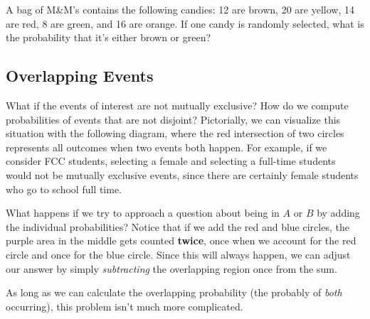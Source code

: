 \begin{try}
A bag of M\&M's contains the following candies:  12 are brown, 20 are yellow, 14 are red, 8 are green, and 16 are orange. If one candy is randomly selected, what is the probability that it's either brown or green? 
\end{try}

\subsection{Overlapping Events}
What if the events of interest are not mutually exclusive? How do we compute probabilities of events that are not disjoint? Pictorially, we can visualize this situation with the following diagram, where the red intersection of two circles represents all outcomes when two events both happen. For example, if we consider FCC students, selecting a female and selecting a full-time students would not be mutually exclusive events, since there are certainly female students who go to school full time.
\begin{center}
\end{center}

What happens if we try to approach a question about being in $A$ or $B$ by adding the individual probabilities?  Notice that if we add the red and blue circles, the purple area in the middle gets counted \textbf{twice}, once when we account for the red circle and once for the blue circle.  Since this will always happen, we can adjust our answer by simply \emph{subtracting} the overlapping region once from the sum.

As long as we can calculate the overlapping probability (the probably of \emph{both} occurring), this problem isn't much more complicated.
\pagebreak

